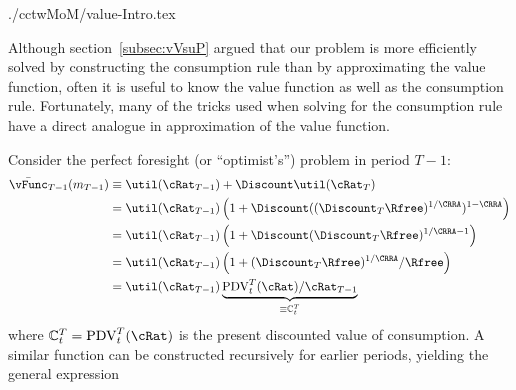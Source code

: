 \documentclass[titlepage]{\econtex}
\begin{document}
\begin{verbatimwrite}{./cctwMoM/value-Intro.tex}

  Although section~\ref{subsec:vVsuP} argued that our problem is more
  efficiently solved by constructing the consumption rule than by
  approximating the value function, often it is useful to know the
  value function as well as the consumption rule.  Fortunately, many
  of the tricks used when solving for the consumption rule have a 
  direct analogue in approximation of the value function.

  Consider the perfect foresight (or ``optimist's'') problem in period $T-1$:
  \begin{equation*}\begin{gathered}\begin{aligned}
    \bar{\vFunc}_{T-1}({m}_{T-1})  & \equiv  \util(\cRat_{T-1})+\Discount \util(\cRat_{T})
    \\  & = \util(\cRat_{T-1})\left(1+\Discount ((\Discount_{T}\Rfree)^{1/\CRRA})^{1-\CRRA}\right)
    \\  & = \util(\cRat_{T-1})\left(1+\Discount (\Discount_{T}\Rfree)^{1/\CRRA-1}\right)
    \\  & = \util(\cRat_{T-1})\left(1+(\Discount_{T}\Rfree)^{1/\CRRA}/\Rfree\right)
    \\  & = \util(\cRat_{T-1})\underbrace{\mbox{PDV}_{t}^{T}(\cRat)/\cRat_{T-1}}_{\equiv \mathbb{C}_{t}^{T}}
  \end{aligned}\end{gathered}\end{equation*}
  where $\mathbb{C}_{t}^{T}=\mbox{PDV}_{t}^{T}(\cRat)$ is the present discounted value of consumption.
  A similar function can be constructed recursively for earlier periods, yielding
  the general expression \hypertarget{vFuncPF}{}
\end{verbatimwrite}

\end{document}

